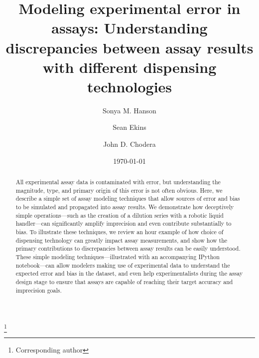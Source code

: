 \documentclass[aps,pre,twocolumn,nofootinbib,superscriptaddress,linenumbers]{revtex4-1}
\begin{document}
\title{Modeling experimental error in assays: Understanding discrepancies between assay results with different dispensing technologies}

\author{Sonya M. Hanson}
\author{Sean Ekins}
\author{John D. Chodera}
 \thanks{Corresponding author}

\date{\today}

\begin{abstract}

All experimental assay data is contaminated with error, but understanding the magnitude, type, and primary origin of this error is not often obvious.
Here, we describe a simple set of assay modeling techniques that allow sources of error and bias to be simulated and propagated into assay results.
We demonstrate how deceptively simple operations---such as the creation of a dilution series with a robotic liquid handler---can significantly amplify imprecision and even contribute substantially to bias.
To illustrate these techniques, we review an hour example of how choice of dispensing technology can greatly impact assay measurements, and show how the primary contributions to discrepancies between assay results can be easily understood.
These simple modeling techniques---illustrated with an accompanying IPython notebook---can allow modelers making use of experimental data to understand the expected error and bias in the dataset, and even help experimentalists during the assay design stage to ensure that assays are capable of reaching their target accuracy and imprecision goals.

\end{abstract}

\maketitle
\end{document}
